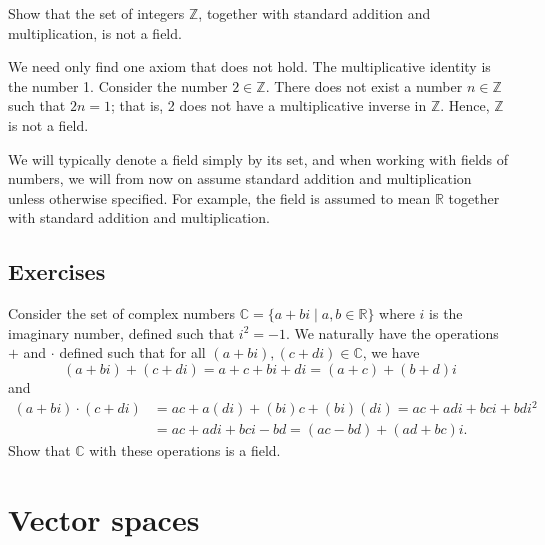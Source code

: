 \begin{example}
Show that the set of integers $ \mathbb{Z} $, together with standard addition and multiplication, is not a field.
\end{example}
\begin{solution}
We need only find one axiom that does not hold. The multiplicative identity is the number 1. Consider the number $ 2\in\mathbb{Z} $. There does not exist a number $ n\in\mathbb{Z} $ such that $ 2n=1 $; that is, 2 does not have a multiplicative inverse in $ \mathbb{Z} $. Hence, $ \mathbb{Z} $ is not a field.
\end{solution}

We will typically denote a field simply by its set, and when working with fields of numbers, we will from now on assume standard addition and multiplication unless otherwise specified. For example, the field  is assumed to mean $ \mathbb{R} $ together with standard addition and multiplication.

\subsection*{Exercises}

\begin{problem}\label{prb:cfield}
Consider the set of complex numbers $ \mathbb{C}=\{a+bi\mid a,b\in\mathbb{R}\} $ where $ i $ is the imaginary number, defined such that $ i^2=-1 $. We naturally have the operations $ + $ and $ \cdot $ defined such that for all $ (a+bi),(c+di)\in\mathbb{C} $, we have
\begin{equation*}
    (a+bi)+(c+di)=a+c+bi+di=(a+c)+(b+d)i
\end{equation*}
and
\begin{align*}
    (a+bi)\cdot(c+di) &= ac+a(di)+(bi)c+(bi)(di)=ac+adi+bci+bdi^2 \\
    &= ac+adi+bci-bd=(ac-bd)+(ad+bc)i.
\end{align*}
Show that $ \mathbb{C} $ with these operations is a field.
\end{problem}

\section{Vector spaces}

